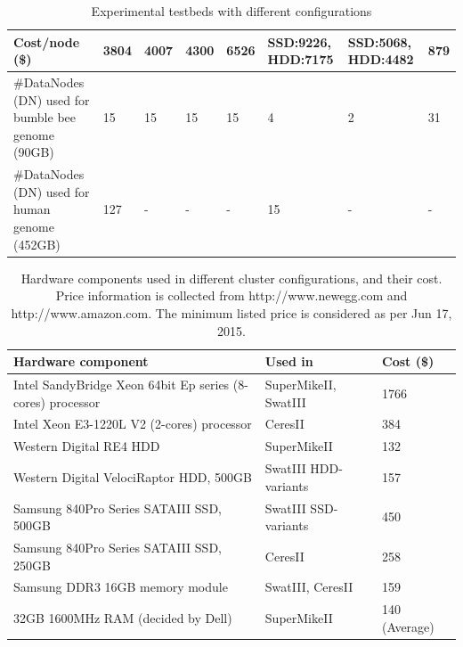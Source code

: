 \documentclass[10pt, conference, compsocconf]{IEEEtran}
\begin{document}
\begin{table}
\begin{center}
\begin{tabular}{ |p{3.2cm} | p{1.6cm} | p{1.6cm} | p{1.6cm} | p{1.9cm} | p{1.6cm} | p{1.6cm}| p{1.9cm}|}
   Cost/node (\$) & 3804 & 4007 & 4300 & 6526 & SSD:9226, HDD:7175 & SSD:5068, HDD:4482 & 879\\ \hline
    \#DataNodes (DN) used for bumble bee genome (90GB) & 15 & 15 & 15 & 15 & 4 & 2 & 31 \\ \hline
    \#DataNodes (DN) used for human genome (452GB)& 127 & - & - & - & 15 & - & - \\ \hline
    \end{tabular}
    \caption{Experimental testbeds with different configurations}
	\label{table:Experimentaltestbeds}
\end{center}
\vspace{-1.5em}
\end{table}
\begin{table}
	\begin{tabular}{ |p{4.4cm} |p{1.6cm} |p{1.6cm} |} \hline
		Hardware component & Used in & Cost (\$)\\ \hline
		Intel SandyBridge Xeon 64bit Ep series (8-cores) processor & SuperMikeII, SwatIII & 1766\\ \hline
		Intel Xeon E3-1220L V2 (2-cores) processor& CeresII & 384\\ \hline
		Western Digital RE4 HDD & SuperMikeII & 132\\ \hline
		Western Digital VelociRaptor HDD, 500GB & SwatIII HDD-variants & 157 \\ \hline
		Samsung 840Pro Series SATAIII SSD, 500GB & SwatIII SSD-variants & 450\\ \hline
		Samsung 840Pro Series SATAIII SSD, 250GB & CeresII & 258\\ \hline
		Samsung DDR3 16GB memory module & SwatIII, CeresII & 159\\ \hline
		32GB 1600MHz RAM (decided by Dell) & SuperMikeII  & 140 (Average)\\ \hline
	\end{tabular}
	\caption{Hardware components used in different cluster configurations, and their cost. Price information is collected from http://www.newegg.com and http://www.amazon.com. The minimum listed price is considered as per Jun 17, 2015.}
	\label{table:PriceOfEachComponent}
\vspace{-2.0em}
\end{table}
\end{document}
